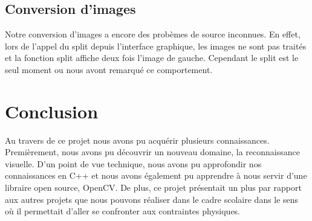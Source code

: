 \documentclass[a4paper]{article}
\begin{document}
\subsection*{Conversion d'images}

Notre conversion d'images a encore des probèmes de source inconnues. En effet, lors de l'appel du split depuis l'interface graphique, les images ne sont pas traités et la fonction split affiche deux fois l'image de gauche. Cependant le split est le seul moment ou nous avont remarqué ce comportement.


\section{Conclusion}

Au travers de ce projet nous avons pu acquérir plusieurs connaissances. Premièrement,
nous avons pu découvrir un nouveau domaine, la reconnaissance visuelle. D'un point
de vue technique, nous avons pu approfondir nos connaissances en C++ et nous avons
également pu apprendre à nous servir d'une libraire open source, OpenCV.
De plus, ce projet présentait un plus par rapport aux autres projets que nous
pouvons réaliser dans le cadre scolaire dans le sens où il permettait d'aller
se confronter aux contraintes physiques.


\end{document}
